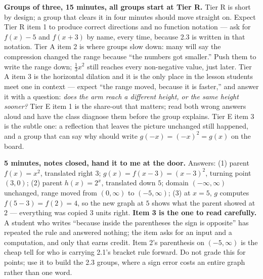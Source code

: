 \documentclass[10pt]{article}
\begin{document}
\boxguard[18]
\begin{teachernote}
    \textbf{Groups of three, 15 minutes, all groups start at Tier R.} Tier R is short by design; a
    group that clears it in four minutes should move straight on. Expect Tier R item 1 to produce
    correct directions and no function notation --- ask for $f(x)-5$ and $f(x+3)$ by name, every
    time, because 2.3 is written in that notation. Tier A item 2 is where groups slow down: many
    will say the compression changed the range because ``the numbers got smaller.'' Push them to
    write the range down; $\tfrac13 x^2$ still reaches every non-negative value, just later. Tier A
    item 3 is the horizontal dilation and it is the only place in the lesson students meet one in
    context --- expect ``the range moved, because it is faster,'' and answer it with a question:
    \emph{does the arm reach a different height, or the same height sooner?} Tier E item 1 is the
    share-out that matters; read both wrong answers aloud and have the class diagnose them before
    the group explains. Tier E item 3 is the subtle one: a reflection that leaves the picture
    unchanged still happened, and a group that can say why should write $g(-x)=(-x)^2=g(x)$ on the
    board.
\end{teachernote}

\boxguard[18]
\begin{teachernote}
    \textbf{5 minutes, notes closed, hand it to me at the door.} Answers: (1) parent $f(x)=x^2$,
    translated right $3$; $g(x)=f(x-3)=(x-3)^2$, turning point $(3,0)$; (2) parent $h(x)=2^x$,
    translated down $5$; domain $(-\infty,\infty)$ unchanged, range moved from $(0,\infty)$ to
    $(-5,\infty)$; (3) at $x=5$, $g$ computes $f(5-3)=f(2)=4$, so the new graph at $5$ shows what
    the parent showed at $2$ --- everything was copied $3$ units right. \textbf{Item 3 is the one
    to read carefully.} A student who writes ``because inside the parentheses the sign is
    opposite'' has repeated the rule and answered nothing; the item asks for an input and a
    computation, and only that earns credit. Item 2's parenthesis on $(-5,\infty)$ is the cheap
    tell for who is carrying 2.1's bracket rule forward. Do not grade this for points; use it to
    build the 2.3 groups, where a sign error costs an entire graph rather than one word.
\end{teachernote}
\end{document}

